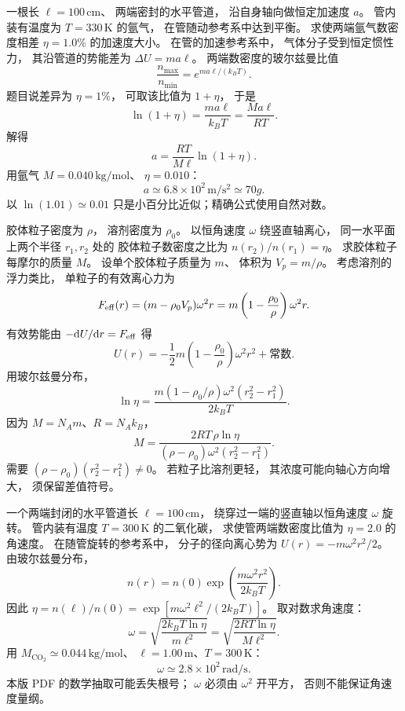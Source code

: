 一根长 $\ell=100\,\mathrm{cm}$、
两端密封的水平管道，
沿自身轴向做恒定加速度 $a$。
管内装有温度为 $T=330\,\mathrm K$ 的氩气，
在管随动参考系中达到平衡。
求使两端氩气数密度相差
$\eta=1.0\%$ 的加速度大小。
\exsolution
在管的加速参考系中，
气体分子受到恒定惯性力，
其沿管道的势能差为
$\Delta U=ma\ell$。
两端数密度的玻尔兹曼比值
\[
\frac{n_{\max}}{n_{\min}}
=e^{ma\ell/(k_BT)}.
\]
题目说差异为 $\eta=1\%$，
可取该比值为 $1+\eta$，
于是
\[
\ln(1+\eta)=\frac{ma\ell}{k_BT}
=\frac{Ma\ell}{RT}.
\]
解得
\[
\boxed{a=\frac{RT}{M\ell}\ln(1+\eta)}.
\]
用氩气 $M=0.040\,\mathrm{kg/mol}$、
$\eta=0.010$：
\[
\boxed{a\simeq6.8\times10^2\,\mathrm{m/s^2}
\simeq70g}.
\]
\excheck 以 $\ln(1.01)\simeq0.01$
只是小百分比近似；精确公式使用自然对数。

胶体粒子密度为 $\rho$，
溶剂密度为 $\rho_0$。
以恒角速度 $\omega$ 绕竖直轴离心，
同一水平面上两个半径 $r_1,r_2$ 处的
胶体粒子数密度之比为
$n(r_2)/n(r_1)=\eta$。
求胶体粒子每摩尔的质量 $M$。
\exsolution
设单个胶体粒子质量为 $m$、
体积为 $V_p=m/\rho$。
考虑溶剂的浮力类比，
单粒子的有效离心力为
\[
F_{\rm eff}(r)=(m-\rho_0V_p)\omega^2r
=m\left(1-\frac{\rho_0}{\rho}\right)\omega^2r.
\]
有效势能由
$-\mathrm dU/\mathrm dr=F_{\rm eff}$ 得
\[
U(r)=-\frac12m\left(1-\frac{\rho_0}{\rho}\right)
\omega^2r^2+\text{常数}.
\]
用玻尔兹曼分布，
\[
\ln\eta=\frac{m(1-\rho_0/\rho)\omega^2
(r_2^2-r_1^2)}{2k_BT}.
\]
因为 $M=N_Am$、$R=N_Ak_B$，
\[
\boxed{M=\frac{2RT\,\rho\ln\eta}
{(\rho-\rho_0)\omega^2(r_2^2-r_1^2)}}.
\]
\excheck 需要 $(\rho-\rho_0)(r_2^2-r_1^2)\ne0$。
若粒子比溶剂更轻，
其浓度可能向轴心方向增大，
须保留差值符号。

一个两端封闭的水平管道长
$\ell=100\,\mathrm{cm}$，
绕穿过一端的竖直轴以恒角速度 $\omega$ 旋转。
管内装有温度
$T=300\,\mathrm K$ 的二氧化碳，
求使管两端数密度比值为 $\eta=2.0$
的角速度。
\exsolution
在随管旋转的参考系中，
分子的径向离心势为
$U(r)=-m\omega^2r^2/2$。
由玻尔兹曼分布，
\[
n(r)=n(0)\exp\left(\frac{m\omega^2r^2}{2k_BT}\right).
\]
因此
$\eta=n(\ell)/n(0)
=\exp[m\omega^2\ell^2/(2k_BT)]$。
取对数求角速度：
\[
\boxed{\omega=\sqrt{\frac{2k_BT\ln\eta}{m\ell^2}}
=\sqrt{\frac{2RT\ln\eta}{M\ell^2}}}.
\]
用 $M_{\mathrm{CO_2}}\simeq0.044\,\mathrm{kg/mol}$、
$\ell=1.00\,\mathrm m$、$T=300\,\mathrm K$：
\[
\boxed{\omega\simeq2.8\times10^2\,\mathrm{rad/s}}.
\]
\excheck 本版 PDF 的数学抽取可能丢失根号；
$\omega$ 必须由 $\omega^2$ 开平方，
否则不能保证角速度量纲。

